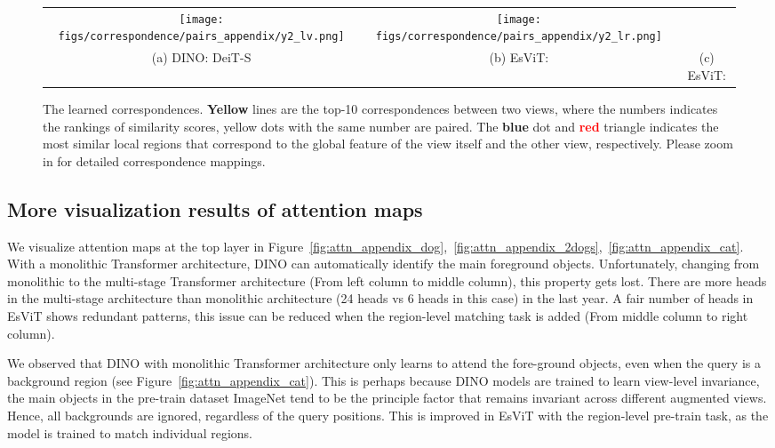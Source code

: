 \documentclass{article} \usepackage{iclr2022_conference,times}
\newcommand{\shortname}{EsViT}
\begin{document}
\begin{figure*}[t!]
\begin{tabular}{c c c}
		\texttt{[image: figs/correspondence/pairs\_appendix/y2\_lv.png]} & 
		\hspace{-3mm}
		\texttt{[image: figs/correspondence/pairs\_appendix/y2\_lr.png]} 		
		\\			
		(a) DINO: DeiT-S  & 
		\hspace{-2mm}
		(b) \shortname{}:     \vspace{2mm} & 
		\hspace{-2mm}		
		(c) \shortname{}:    \hspace{-0mm} \\ 
	\end{tabular}
	\vspace{-3mm}
	\caption{The learned correspondences.  {\bf \textcolor{yellow!80!black}{Yellow}}  lines are the top-10 correspondences between two views, where the numbers indicates the rankings of similarity scores, yellow dots with the same number are paired. The  {\bf \textcolor{blue!50}{blue}} dot and {\bf \textcolor{red}{red}}  triangle indicates the most similar local regions that correspond to the global feature of the view itself and the other view, respectively. Please zoom in for detailed correspondence mappings.
	 }
	\vspace{-1mm}
	\label{fig:correspondences_appendix}
\end{figure*}



\subsection{More visualization results of attention maps}
We visualize attention maps at the top layer in Figure~\ref{fig:attn_appendix_dog},~\ref{fig:attn_appendix_2dogs},~\ref{fig:attn_appendix_cat}. 
With a monolithic Transformer architecture, DINO can automatically identify the main foreground objects. Unfortunately, changing from monolithic to the multi-stage Transformer architecture (From left column to middle column), this property gets lost. There are more heads in the multi-stage architecture than monolithic architecture (24 heads vs 6 heads in this case) in the last year. A fair number of heads in \shortname{} shows redundant patterns, this issue can be reduced when the region-level matching task is added (From middle column to right column). 


We observed that DINO with monolithic Transformer architecture only learns to attend the fore-ground objects, even when the query is a background region (see Figure~\ref{fig:attn_appendix_cat}). This is perhaps because DINO models are trained to learn view-level invariance, the main objects in the pre-train dataset ImageNet tend to be the principle factor that remains invariant across different augmented views. Hence, all backgrounds are ignored, regardless of the query positions. This is improved in \shortname{} with the region-level pre-train task, as the model is trained to match individual regions.
\end{document}
